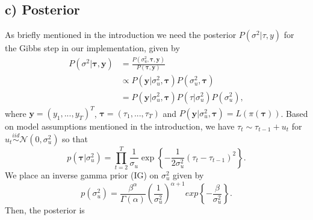 \documentclass[
]{article}
\begin{document}
\hypertarget{c-posterior}{%
\subsection{c) Posterior}\label{c-posterior}}

As briefly mentioned in the introduction we need the posterior \(P(\sigma^2 | \tau, y)\) for the Gibbs step in our implementation, given by
\[
\begin{aligned}
  P(\sigma^2 | \boldsymbol{\tau}, \boldsymbol{y}) &= \frac{P(\sigma^2_u, \boldsymbol{\tau}, \boldsymbol{y})}{P(\boldsymbol{\tau}, \boldsymbol{y})}
  \\
  &\propto  P(\boldsymbol{y} | \sigma^2_u,\boldsymbol{\tau}) P(\sigma^2_u,\boldsymbol{\tau})
  \\
  &= P(\boldsymbol{y} | \sigma^2_u,\boldsymbol{\tau}) P(\tau|\sigma^2_u)P(\sigma^2_u),
\end{aligned}
\]
where \(\boldsymbol{y} = (y_1,...,y_T)^T\), \(\boldsymbol{\tau} = (\tau_1,..., \tau_T)\) and \(P(\boldsymbol{y} | \sigma^2_u,\boldsymbol{\tau}) = L(\pi( \boldsymbol{\tau}))\). Based on model assumptions mentioned in the introduction, we have \(\tau_t \sim \tau_{t-1} + u_t\) for \(u_t \stackrel{iid}{\sim} \mathcal{N}(0, \sigma_u^2)\) so that
\[
p(\boldsymbol{\tau} | \sigma_u^2) = \prod_{t=2}^{T} \frac{1}{\sigma_u} \exp\left\{ -\frac{1}{2\sigma^2_u}(\tau_t - \tau_{t-1})^2 \right\}.
\]
We place an inverse gamma prior (IG) on \(\sigma_u^2\) given by
\[
p(\sigma_u^2) = \frac{\beta^\alpha}{\Gamma(\alpha)} \left( \frac{1}{\sigma_u^2} \right)^{\alpha+1} exp\left\{ - \frac{\beta}{\sigma_u^2} \right\}.
\]
Then, the posterior is
\end{document}
